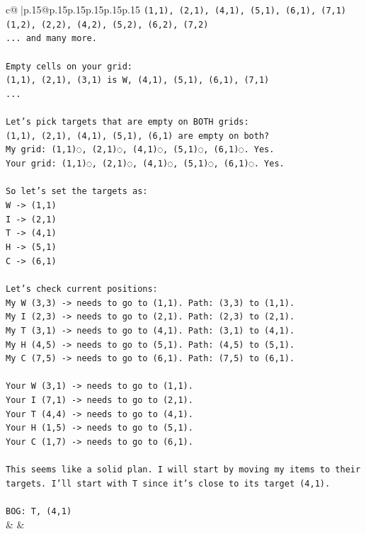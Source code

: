 \documentclass{article}
\begin{document}
{\begin{supertabular}{c@{$\;$}|p{.15\linewidth}@{}p{.15\linewidth}p{.15\linewidth}p{.15\linewidth}p{.15\linewidth}p{.15\linewidth}}
{{{\texttt{(1,1), (2,1), (4,1), (5,1), (6,1), (7,1)} \\
\texttt{(1,2), (2,2), (4,2), (5,2), (6,2), (7,2)} \\
\texttt{... and many more.} \\
\\ 
\texttt{Empty cells on your grid:} \\
\texttt{(1,1), (2,1), (3,1) is W, (4,1), (5,1), (6,1), (7,1)} \\
\texttt{...} \\
\\ 
\texttt{Let's pick targets that are empty on BOTH grids:} \\
\texttt{(1,1), (2,1), (4,1), (5,1), (6,1) are empty on both?} \\
\texttt{My grid: (1,1)◌, (2,1)◌, (4,1)◌, (5,1)◌, (6,1)◌. Yes.} \\
\texttt{Your grid: (1,1)◌, (2,1)◌, (4,1)◌, (5,1)◌, (6,1)◌. Yes.} \\
\\ 
\texttt{So let's set the targets as:} \\
\texttt{W {-}> (1,1)} \\
\texttt{I {-}> (2,1)} \\
\texttt{T {-}> (4,1)} \\
\texttt{H {-}> (5,1)} \\
\texttt{C {-}> (6,1)} \\
\\ 
\texttt{Let's check current positions:} \\
\texttt{My W (3,3) {-}> needs to go to (1,1). Path: (3,3) to (1,1).} \\
\texttt{My I (2,3) {-}> needs to go to (2,1). Path: (2,3) to (2,1).} \\
\texttt{My T (3,1) {-}> needs to go to (4,1). Path: (3,1) to (4,1).} \\
\texttt{My H (4,5) {-}> needs to go to (5,1). Path: (4,5) to (5,1).} \\
\texttt{My C (7,5) {-}> needs to go to (6,1). Path: (7,5) to (6,1).} \\
\\ 
\texttt{Your W (3,1) {-}> needs to go to (1,1).} \\
\texttt{Your I (7,1) {-}> needs to go to (2,1).} \\
\texttt{Your T (4,4) {-}> needs to go to (4,1).} \\
\texttt{Your H (1,5) {-}> needs to go to (5,1).} \\
\texttt{Your C (1,7) {-}> needs to go to (6,1).} \\
\\ 
\texttt{This seems like a solid plan. I will start by moving my items to their targets. I'll start with T since it's close to its target (4,1).} \\
\\ 
\texttt{BOG: T, (4,1)} \\
            }
        }
    }
    & & \\ \\


\end{supertabular}}
\end{document}
